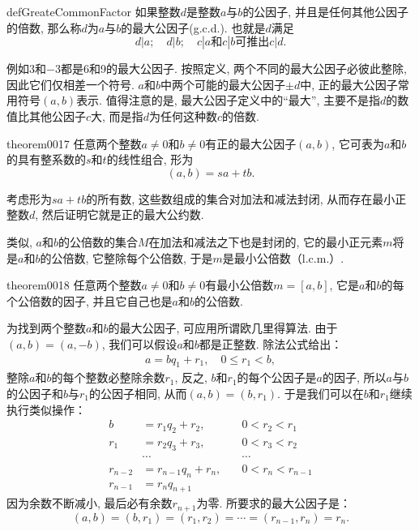 \begin{definition}{}{defGreateCommonFactor}
如果整数$d$是整数$a$与$b$的公因子, 并且是任何其他公因子的倍数, 那么称$d$为$a$与$b$的最大公因子(g.c.d.). 也就是$d$满足
\[
d|a; \quad{}d|b;\quad{} c|a\text{和}c|b \text{可推出}c|d.
\]
\end{definition}

例如$3$和$-3$都是6和9的最大公因子. 按照定义, 两个不同的最大公因子必彼此整除, 因此它们仅相差一个符号. $a$和$b$中两个可能的最大公因子$\pm{}d$中, 正的最大公因子常用符号$(a, b)$表示. 值得注意的是, 最大公因子定义中的“最大”, 主要不是指$d$的数值比其他公因子$c$大, 而是指$d$为任何这种数$c$的倍数. 

\begin{theorem}{}{theorem0017}
任意两个整数$a \neq 0$和$b \neq 0$有正的最大公因子$(a, b)$, 它可表为$a$和$b$的具有整系数的$s$和$t$的线性组合, 形为
\begin{equation}\label{equation0013}
(a,b)=sa+tb.
\end{equation}
\end{theorem}

考虑形为$sa+tb$的所有数, 这些数组成的集合对加法和减法封闭, 从而存在最小正整数$d$, 然后证明它就是正的最大公约数. 

类似, $a$和$b$的公倍数的集合$M$在加法和减法之下也是封闭的, 它的最小正元素$m$将是$a$和$b$的公倍数, 它整除每个公倍数, 于是$m$是最小公倍数（l.c.m.）. 
\begin{theorem}{}{theorem0018}
任意两个整数$a \neq 0$和$b \neq 0$有最小公倍数$m=[a, b]$, 它是$a$和$b$的每个公倍数的因子, 并且它自己也是$a$和$b$的公倍数. 
\end{theorem}

为找到两个整数$a$和$b$的最大公因子, 可应用所谓欧几里得算法. 由于$(a, b) = (a, -b)$, 我们可以假设$a$和$b$都是正整数. 除法公式给出：
\begin{gather}\label{equation0014}
a = bq_1+r_1, \quad 0 \le r_1 < b,
\end{gather}
整除$a$和$b$的每个整数必整除余数$r_1$, 反之, $b$和$r_1$的每个公因子是$a$的因子, 所以$a$与$b$的公因子和$b$与$r_1$的公因子相同, 从而$(a,b)= (b, r_1)$. 于是我们可以在$b$和$r_1$继续执行类似操作：
\begin{equation}
\begin{aligned}
b &= r_1q_2 + r_2, \quad  &0 < r_2 < r_1 \\
r_1 &= r_2q_3 + r_3, \quad &0 < r_3 < r_2 \\
&\cdots& \cdots\\
r_{n-2} &= r_{n-1}q_n + r_n, \quad &0 < r_n < r_{n-1}\\
r_{n-1} &= r_nq_{n+1}&
\end{aligned}
\end{equation}
因为余数不断减小, 最后必有余数$r_{n+1}$为零. 所要求的最大公因子是：
\[
(a, b) = (b, r_1) = (r_1, r_2) = \cdots = (r_{n-1}, r_n) = r_n.
\]


